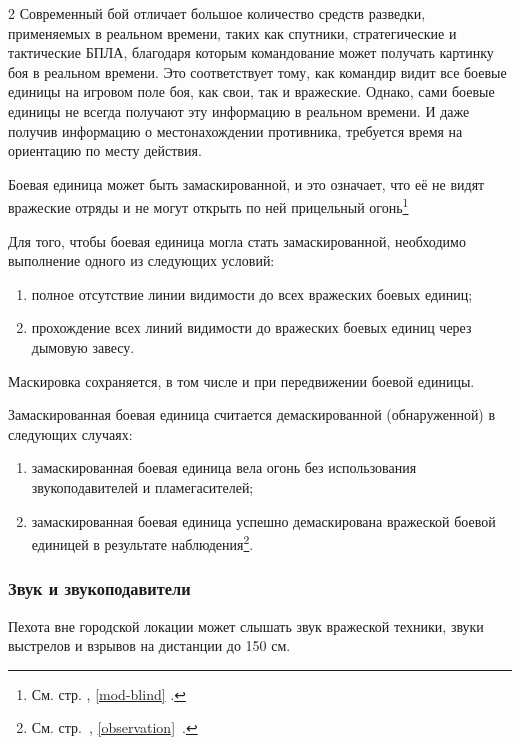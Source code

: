 \documentclass[twoside]{article}
\begin{document}
\begin{multicols}{2}
Современный бой отличает большое количество средств разведки,
применяемых в реальном времени, таких как спутники, стратегические и
тактические БПЛА, благодаря которым командование может получать картинку
боя в реальном времени. Это соответствует тому, как командир видит все
боевые единицы на игровом поле боя, как свои, так и вражеские. Однако,
сами боевые единицы не всегда получают эту информацию в реальном
времени. И даже получив информацию о местонахождении противника,
требуется время на ориентацию по месту действия.

Боевая единица может быть замаскированной, и это означает, что
её не видят вражеские отряды и не могут открыть по ней прицельный
огонь\footnote{См. стр. \pageref{mod-blind}, \ref{mod-blind} .}

Для того, чтобы боевая единица могла стать замаскированной,
необходимо выполнение одного из следующих условий:

\begin{enumerate}
\def\labelenumi{\arabic{enumi}.}
\item
  полное отсутствие линии видимости до всех вражеских боевых единиц;
\item
  прохождение всех линий видимости до вражеских боевых единиц через
  дымовую завесу.
\end{enumerate}

Маскировка сохраняется, в том числе и при передвижении боевой единицы.

Замаскированная боевая единица считается демаскированной (обнаруженной) в следующих случаях:

\begin{enumerate}
\def\labelenumi{\arabic{enumi}.}
\item
  замаскированная боевая единица вела огонь без использования
  звукоподавителей и пламегасителей;
\item
  замаскированная боевая единица успешно демаскирована
  вражеской боевой единицей в результате наблюдения\footnote{См. стр.~\pageref{observation}, \ref{observation}~.}.
\end{enumerate}

\subsubsection{Звук и звукоподавители}\label{sound}

Пехота вне городской локации может слышать звук вражеской техники, звуки
выстрелов и взрывов на дистанции до 150 см.


\end{multicols}
\end{document}
